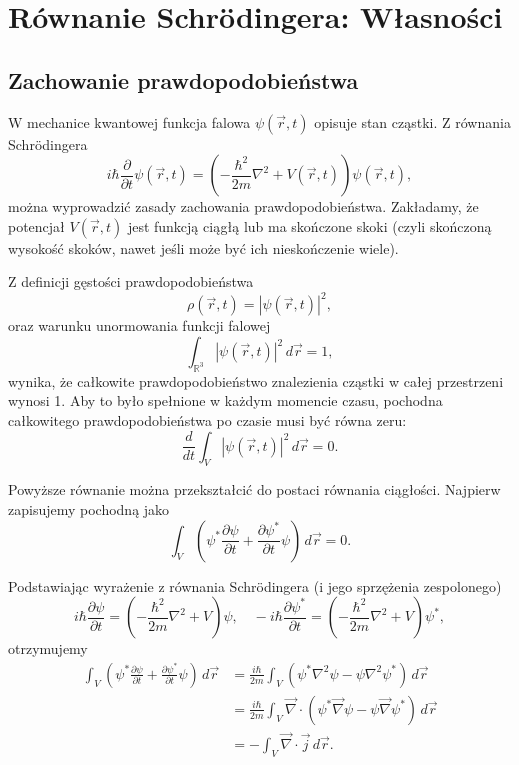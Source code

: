 \section{Równanie Schrödingera: Własności}

\subsection{Zachowanie prawdopodobieństwa}

W mechanice kwantowej funkcja falowa $\psi(\vec{r}, t)$ opisuje stan cząstki. Z równania Schrödingera
$$
i\hbar \frac{\partial}{\partial t} \psi(\vec{r}, t) = \left( -\frac{\hbar^2}{2m} \nabla^2 + V(\vec{r}, t) \right) \psi(\vec{r}, t),
$$
można wyprowadzić zasady zachowania prawdopodobieństwa. Zakładamy, że potencjał $V(\vec{r}, t)$ jest funkcją ciągłą lub ma skończone skoki (czyli skończoną wysokość skoków, nawet jeśli może być ich nieskończenie wiele). 

Z definicji gęstości prawdopodobieństwa
$$
\rho(\vec{r}, t) = |\psi(\vec{r}, t)|^2,
$$
oraz warunku unormowania funkcji falowej
$$
\int_{\mathbb{R}^3} |\psi(\vec{r}, t)|^2 \, d\vec{r} = 1,
$$
wynika, że całkowite prawdopodobieństwo znalezienia cząstki w całej przestrzeni wynosi 1. Aby to było spełnione w każdym momencie czasu, pochodna całkowitego prawdopodobieństwa po czasie musi być równa zeru:
$$
\frac{d}{dt} \int_V |\psi(\vec{r}, t)|^2 \, d\vec{r} = 0.
$$

Powyższe równanie można przekształcić do postaci równania ciągłości. Najpierw zapisujemy pochodną jako
$$
\int_V \left( \psi^* \frac{\partial \psi}{\partial t} + \frac{\partial \psi^*}{\partial t} \psi \right) \, d\vec{r} = 0.
$$

Podstawiając wyrażenie z równania Schrödingera (i jego sprzężenia zespolonego)
$$
i\hbar \frac{\partial \psi}{\partial t} = \left( -\frac{\hbar^2}{2m} \nabla^2 + V \right) \psi, \quad
-i\hbar \frac{\partial \psi^*}{\partial t} = \left( -\frac{\hbar^2}{2m} \nabla^2 + V \right) \psi^*,
$$
otrzymujemy
\begin{align*}
\int_V \left( \psi^* \frac{\partial \psi}{\partial t} + \frac{\partial \psi^*}{\partial t} \psi \right) \, d\vec{r}
&= \frac{i\hbar}{2m} \int_V \left( \psi^* \nabla^2 \psi - \psi \nabla^2 \psi^* \right) \, d\vec{r} \\
&= \frac{i\hbar}{2m} \int_V \vec{\nabla} \cdot \left( \psi^* \vec{\nabla} \psi - \psi \vec{\nabla} \psi^* \right) \, d\vec{r} \\
&= - \int_V \vec{\nabla} \cdot \vec{j} \, d\vec{r}.
\end{align*}

